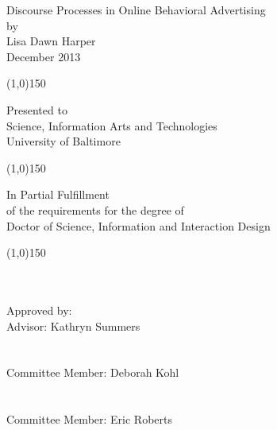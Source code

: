 
\thispagestyle{empty}
\renewcommand{\baselinestretch}{2}
\begin{center}

\normalsize
Discourse Processes in Online Behavioral Advertising \\
by \\
Lisa Dawn Harper \\ %
December 2013%

\begin{center}
\line(1,0){150}
\end{center}


Presented to \\
Science, Information Arts and Technologies \\
University of Baltimore

\begin{center}
\line(1,0){150}
\end{center}

In Partial Fulfillment \\
of the requirements for the degree of \\
Doctor of Science, Information and Interaction Design \\
\end{center}

\begin{center}
\line(1,0){150}
\end{center}
\ \\
\ \\
Approved by:  \hspace{3 mm}  \underline{\hspace{7cm}}\\
\indent\indent\indent\indent\indent\indent\indent\indent Advisor: Kathryn Summers \\
\\
\indent\indent\indent\indent\indent\indent\indent\indent \underline{\hspace{7cm}} \\
\indent\indent\indent\indent\indent\indent\indent\indent Committee Member: Deborah Kohl \\
\\
\indent\indent\indent\indent\indent\indent\indent\indent \underline{\hspace{7cm}} \\
\indent\indent\indent\indent\indent\indent\indent\indent Committee Member: Eric Roberts \\
\renewcommand{\baselinestretch}{1}
